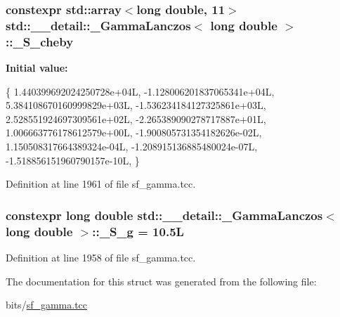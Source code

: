 \subsubsection[{\texorpdfstring{\+\_\+\+S\+\_\+cheby}{_S_cheby}}]{\setlength{\rightskip}{0pt plus 5cm}constexpr std\+::array$<$long double, 11$>$ {\bf std\+::\+\_\+\+\_\+detail\+::\+\_\+\+Gamma\+Lanczos}$<$ long double $>$\+::\+\_\+\+S\+\_\+cheby\hspace{0.3cm}{\ttfamily [static]}}\hypertarget{structstd_1_1____detail_1_1__GammaLanczos_3_01long_01double_01_4_a5e4729a81b6fea142833b8198d5c6260}{}\label{structstd_1_1____detail_1_1__GammaLanczos_3_01long_01double_01_4_a5e4729a81b6fea142833b8198d5c6260}
{\bfseries Initial value\+:}
\begin{DoxyCode}
\{
    1.440399692024250728e+04L,
    -1.128006201837065341e+04L,
    5.384108670160999829e+03L,
    -1.536234184127325861e+03L,
    2.528551924697309561e+02L,
    -2.265389090278717887e+01L,
    1.006663776178612579e+00L,
    -1.900805731354182626e-02L,
    1.150508317664389324e-04L,
    -1.208915136885480024e-07L,
    -1.518856151960790157e-10L,
      \}
\end{DoxyCode}


Definition at line 1961 of file sf\+\_\+gamma.\+tcc.

\subsubsection[{\texorpdfstring{\+\_\+\+S\+\_\+g}{_S_g}}]{\setlength{\rightskip}{0pt plus 5cm}constexpr long double {\bf std\+::\+\_\+\+\_\+detail\+::\+\_\+\+Gamma\+Lanczos}$<$ long double $>$\+::\+\_\+\+S\+\_\+g = 10.\+5L\hspace{0.3cm}{\ttfamily [static]}}\hypertarget{structstd_1_1____detail_1_1__GammaLanczos_3_01long_01double_01_4_a9748c741681bc10b5679badb0143f47c}{}\label{structstd_1_1____detail_1_1__GammaLanczos_3_01long_01double_01_4_a9748c741681bc10b5679badb0143f47c}


Definition at line 1958 of file sf\+\_\+gamma.\+tcc.



The documentation for this struct was generated from the following file\+:\begin{DoxyCompactItemize}
\item 
bits/\hyperlink{sf__gamma_8tcc}{sf\+\_\+gamma.\+tcc}\end{DoxyCompactItemize}
